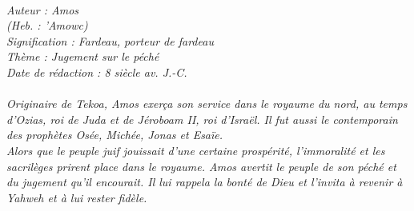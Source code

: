 \BFont
\noindent\hrulefill
{\footnotesize
\textit{
\bigskip
{\centering{}
\\Auteur : Amos
\\(Heb. : 'Amowc)
\\Signification : Fardeau, porteur de fardeau
\\Thème : Jugement sur le péché
\\Date de rédaction : 8 siècle av. J.-C.\\}
}
\textit{
\\Originaire de Tekoa, Amos exerça son service dans le royaume du nord, au temps d'Ozias, roi de Juda et de Jéroboam II, roi d'Israël. Il fut aussi le contemporain des prophètes Osée, Michée, Jonas et Esaïe.
\\Alors que le peuple juif jouissait d'une certaine prospérité, l'immoralité et les sacrilèges prirent place dans le royaume. Amos avertit le peuple de son péché et du jugement qu'il encourait. Il lui rappela la bonté de Dieu et l'invita à revenir à Yahweh et à lui rester fidèle.\bigskip
}
}
\par\nobreak\noindent\hrulefill
